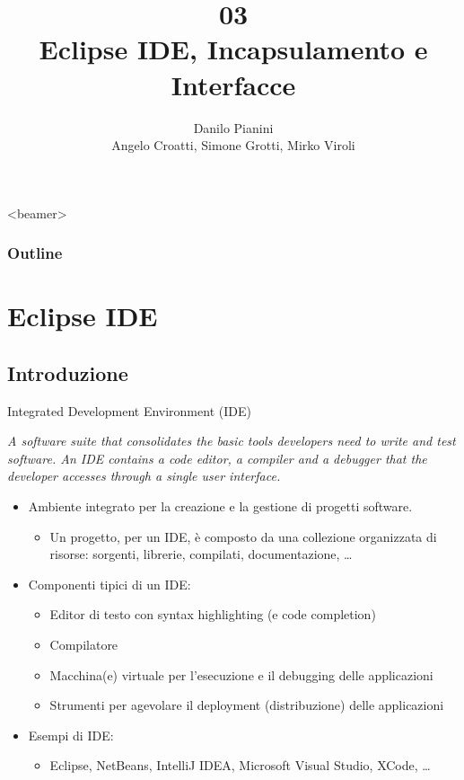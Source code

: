 \documentclass[presentation]{beamer}
\title[OOP03 -- Interfaces]{03\\Eclipse IDE, Incapsulamento e Interfacce}
\author[Pianini]{Danilo Pianini\\Angelo Croatti, Simone Grotti, Mirko Viroli}
\begin{document}
	
\frame[label=coverpage]{\titlepage}

\begin{frame}<beamer>
	\frametitle{Outline}
	\tableofcontents[]
\end{frame}

\section{Eclipse IDE}
\subsection{Introduzione}

\begin{frame}{Integrated Development Environment (IDE)}
	\begin{block}{}
		\emph{A software suite that consolidates the basic tools developers need to write and test software. An IDE contains a code editor, a compiler and a debugger that the developer accesses through a single user interface.}
	\end{block}
	\begin{itemize}
		\item Ambiente integrato per la creazione e la gestione di progetti software.
		\begin{itemize}
			\item Un progetto, per un IDE, è composto da una collezione organizzata di risorse: sorgenti, librerie, compilati, documentazione, \dots
		\end{itemize}
		\item Componenti tipici di un IDE:
		\begin{itemize}
			\item Editor di testo con syntax highlighting (e code completion)
			\item Compilatore
			\item Macchina(e) virtuale per l'esecuzione e il debugging delle applicazioni
			\item Strumenti per agevolare il deployment (distribuzione) delle applicazioni
		\end{itemize}
		\item Esempi di IDE:
		\begin{itemize}
			\item Eclipse, NetBeans, IntelliJ IDEA, Microsoft Visual Studio, XCode, \dots
		\end{itemize}
	\end{itemize}
\end{frame}
\end{document}
